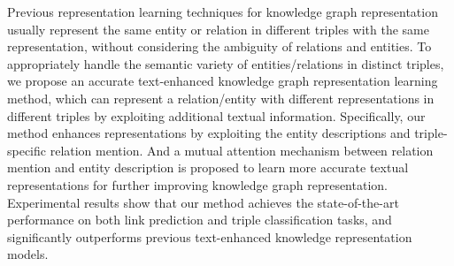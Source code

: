 Previous representation learning techniques for knowledge graph representation usually represent the same entity or relation in different triples with the same representation, without considering the ambiguity of relations and entities. To appropriately handle the semantic variety  of entities/relations in distinct triples, we propose an accurate text-enhanced knowledge graph representation learning method, which can represent a relation/entity with different representations in different triples by exploiting additional textual information. Specifically, our method enhances representations by exploiting the entity descriptions and triple-specific relation mention. And a mutual attention mechanism between relation mention and entity description is proposed  to learn more accurate textual representations for further improving knowledge graph representation. Experimental results show that our method achieves the state-of-the-art performance on both link prediction and triple classification tasks, and significantly outperforms previous text-enhanced knowledge representation models.
